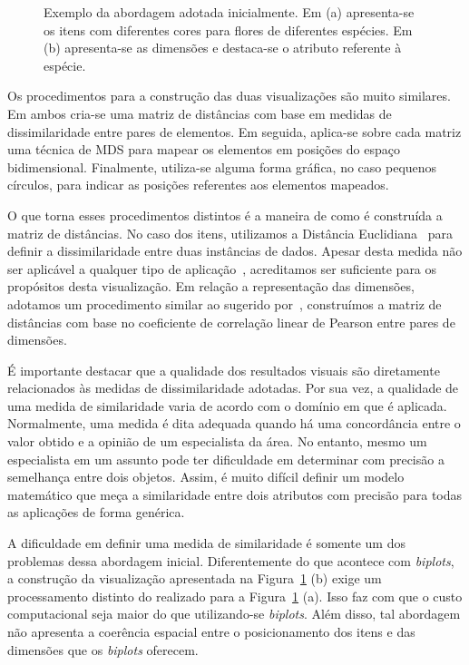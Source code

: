 \begin{figure}[h!]
\begin{subfigure}[b]{0.45\textwidth}
\begin{framed}
        \end{framed}
        \caption{}
    \end{subfigure} 
    \caption[Exemplo da abordagem adotada inicialmente]
    {Exemplo da abordagem adotada inicialmente. Em
        (a) apresenta-se os itens com diferentes cores para
        flores de diferentes espécies. Em (b) apresenta-se
        as dimensões e destaca-se o atributo referente à
        espécie.}
    \label{fig:dual}
\end{figure}

Os procedimentos para a construção das duas visualizações
são muito similares. Em ambos cria-se uma
matriz de distâncias com base em medidas de dissimilaridade
entre pares de elementos. Em seguida, aplica-se sobre cada 
matriz uma técnica de MDS para mapear os elementos em 
posições do espaço bidimensional. Finalmente, utiliza-se
alguma forma gráfica, no caso pequenos círculos, para
indicar as posições referentes aos elementos mapeados.

O que torna esses procedimentos distintos é a maneira de
como é construída a matriz de distâncias. No caso dos itens,
utilizamos a Distância Euclidiana~\cite{Cha2007} para
definir a dissimilaridade entre duas instâncias de dados.
Apesar desta medida não ser aplicável a qualquer tipo de
aplicação~\cite{Cha2007}, acreditamos ser suficiente para os
propósitos desta visualização. Em relação a representação
das dimensões, adotamos um procedimento similar ao sugerido
por~\citet{Yang2003}, construímos a matriz de distâncias com
base no coeficiente de correlação linear de Pearson entre
pares de dimensões.

É importante destacar que a qualidade dos resultados visuais
são diretamente relacionados às medidas de dissimilaridade
adotadas. Por sua vez, a qualidade de uma medida de
similaridade varia de acordo com o domínio em que é
aplicada. Normalmente, uma medida é dita adequada quando há
uma concordância entre o valor obtido e a opinião de um
especialista da área. No entanto, mesmo um especialista em
um assunto pode ter dificuldade em determinar com precisão a
semelhança entre dois objetos. Assim, é muito difícil
definir um modelo matemático que meça a similaridade entre
dois atributos com precisão para todas as aplicações de
forma genérica. 

A dificuldade em definir uma medida de similaridade é
somente um dos problemas dessa abordagem inicial.
Diferentemente do que acontece com \emph{biplots}, a construção da
visualização apresentada na Figura~\ref{fig:dual} (b) exige
um processamento distinto do realizado para a
Figura~\ref{fig:dual} (a). Isso faz com que o custo
computacional seja maior do que
utilizando-se \emph{biplots}. Além disso, tal abordagem não
apresenta a coerência espacial entre o posicionamento dos
itens e das dimensões que os \emph{biplots} oferecem.

